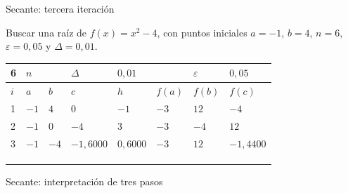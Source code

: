 \documentclass[main.tex]{subfiles}
\begin{document}
\begin{frame}[t]{Secante: tercera iteración}
\begin{minipage}[t][13mm][t]{\textwidth}\small Buscar una raíz de $f(x)=x^2-4$, con puntos iniciales $a=-1$, $b=4$, $n=6$, $\varepsilon=0{,}05$ y $\Delta=0{,}01$.\end{minipage}\par{\scriptsize\setlength{\tabcolsep}{2pt}\renewcommand{\arraystretch}{1}\begin{center}\begin{tabular}{|C{.04\textwidth}|C{.112\textwidth}|C{.112\textwidth}|C{.112\textwidth}|C{.112\textwidth}|C{.112\textwidth}|C{.112\textwidth}|C{.112\textwidth}|}
\hline
\rule{0pt}{4.3mm}6 & $n$ &  &  $\Delta$  & $0{,}01$ &  & $\varepsilon$ & $0{,}05$\\\hline
\rule{0pt}{4.3mm}$i$ & $a$ & $b$ & $c$ & $h$ & $f(a)$ & $f(b)$ & $f(c)$\\\hline
\rule{0pt}{4.3mm}1 & $-1$ & $4$ & $0$ & $-1$ & $-3$ & $12$ & $-4$\\\hline
\rule{0pt}{4.3mm}2 & $-1$ & $0$ & $-4$ & $3$ & $-3$ & $-4$ & $12$\\\hline
\rule{0pt}{4.3mm}3 & $-1$ & $-4$ & $-1{,}6000$ & $0{,}6000$ & $-3$ & $12$ & $-1{,}4400$\\\hline
\rule{0pt}{4.3mm} &  &  &  &  &  &  & \\\hline
\rule{0pt}{4.3mm} &  &  &  &  &  &  & \\\hline
\rule{0pt}{4.3mm} &  &  &  &  &  &  & \\\hline
\end{tabular}\end{center}}\begin{minipage}[t][10mm][t]{\textwidth}\footnotesize \end{minipage}
\end{frame}

\begin{frame}{Secante: interpretación de tres pasos}
\end{frame}
\end{document}
